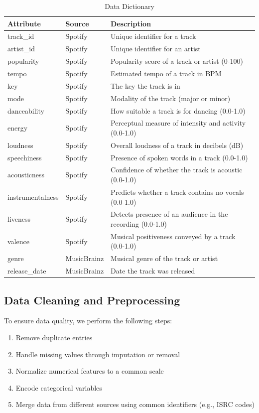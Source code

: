 \documentclass[runningheads]{llncs}
\begin{document}
\begin{table}[h]
\begin{tabular}{|l|l|p{8cm}|}
\hline
\textbf{Attribute} & \textbf{Source} & \textbf{Description} \\
\hline
track\_id & Spotify & Unique identifier for a track \\
artist\_id & Spotify & Unique identifier for an artist \\
popularity & Spotify & Popularity score of a track or artist (0-100) \\
tempo & Spotify & Estimated tempo of a track in BPM \\
key & Spotify & The key the track is in \\
mode & Spotify & Modality of the track (major or minor) \\
danceability & Spotify & How suitable a track is for dancing (0.0-1.0) \\
energy & Spotify & Perceptual measure of intensity and activity (0.0-1.0) \\
loudness & Spotify & Overall loudness of a track in decibels (dB) \\
speechiness & Spotify & Presence of spoken words in a track (0.0-1.0) \\
acousticness & Spotify & Confidence of whether the track is acoustic (0.0-1.0) \\
instrumentalness & Spotify & Predicts whether a track contains no vocals (0.0-1.0) \\
liveness & Spotify & Detects presence of an audience in the recording (0.0-1.0) \\
valence & Spotify & Musical positiveness conveyed by a track (0.0-1.0) \\
genre & MusicBrainz & Musical genre of the track or artist \\
release\_date & MusicBrainz & Date the track was released \\
\hline
\end{tabular}
\caption{Data Dictionary}
\label{tab:data_dict}
\end{table}

\subsection{Data Cleaning and Preprocessing}
To ensure data quality, we perform the following steps:
\begin{enumerate}
    \item Remove duplicate entries
    \item Handle missing values through imputation or removal
    \item Normalize numerical features to a common scale
    \item Encode categorical variables
    \item Merge data from different sources using common identifiers (e.g., ISRC codes)
\end{enumerate}
\end{document}
